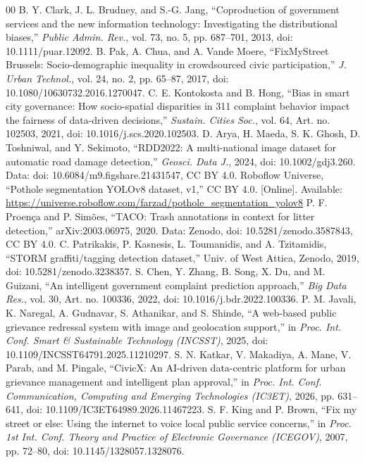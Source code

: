 \documentclass{ieeeaccess}
\begin{document}
\begin{thebibliography}{00}
 B. Y. Clark, J. L. Brudney, and S.-G. Jang, ``Coproduction of government services and the new information technology: Investigating the distributional biases,'' \textit{Public Admin. Rev.}, vol. 73, no. 5, pp. 687--701, 2013, doi: 10.1111/puar.12092.
 B. Pak, A. Chua, and A. Vande Moere, ``FixMyStreet Brussels: Socio-demographic inequality in crowdsourced civic participation,'' \textit{J. Urban Technol.}, vol. 24, no. 2, pp. 65--87, 2017, doi: 10.1080/10630732.2016.1270047.
 C. E. Kontokosta and B. Hong, ``Bias in smart city governance: How socio-spatial disparities in 311 complaint behavior impact the fairness of data-driven decisions,'' \textit{Sustain. Cities Soc.}, vol. 64, Art. no. 102503, 2021, doi: 10.1016/j.scs.2020.102503.
 D. Arya, H. Maeda, S. K. Ghosh, D. Toshniwal, and Y. Sekimoto, ``RDD2022: A multi-national image dataset for automatic road damage detection,'' \textit{Geosci. Data J.}, 2024, doi: 10.1002/gdj3.260. Data: doi: 10.6084/m9.figshare.21431547, CC BY 4.0.
 Roboflow Universe, ``Pothole segmentation YOLOv8 dataset, v1,'' CC BY 4.0. [Online]. Available: \url{https://universe.roboflow.com/farzad/pothole_segmentation_yolov8}
 P. F. Proença and P. Simões, ``TACO: Trash annotations in context for litter detection,'' arXiv:2003.06975, 2020. Data: Zenodo, doi: 10.5281/zenodo.3587843, CC BY 4.0.
 C. Patrikakis, P. Kasnesis, L. Toumanidis, and A. Tzitamidis, ``STORM graffiti/tagging detection dataset,'' Univ. of West Attica, Zenodo, 2019, doi: 10.5281/zenodo.3238357.
 S. Chen, Y. Zhang, B. Song, X. Du, and M. Guizani, ``An intelligent government complaint prediction approach,'' \textit{Big Data Res.}, vol. 30, Art. no. 100336, 2022, doi: 10.1016/j.bdr.2022.100336.
 P. M. Javali, K. Naregal, A. Gudnavar, S. Athanikar, and S. Shinde, ``A web-based public grievance redressal system with image and geolocation support,'' in \textit{Proc. Int. Conf. Smart \& Sustainable Technology (INCSST)}, 2025, doi: 10.1109/INCSST64791.2025.11210297.
 S. N. Katkar, V. Makadiya, A. Mane, V. Parab, and M. Pingale, ``CivicX: An AI-driven data-centric platform for urban grievance management and intelligent plan approval,'' in \textit{Proc. Int. Conf. Communication, Computing and Emerging Technologies (IC3ET)}, 2026, pp. 631--641, doi: 10.1109/IC3ET64989.2026.11467223.
 S. F. King and P. Brown, ``Fix my street or else: Using the internet to voice local public service concerns,'' in \textit{Proc. 1st Int. Conf. Theory and Practice of Electronic Governance (ICEGOV)}, 2007, pp. 72--80, doi: 10.1145/1328057.1328076.

\end{thebibliography}
\end{document}
